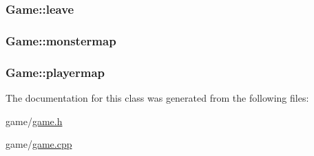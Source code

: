 \hypertarget{class_game_ace7ec571f69a4a210e5a4d1f80232753}{
\subsubsection[{leave}]{ Game\-::leave}}\label{class_game_ace7ec571f69a4a210e5a4d1f80232753}
\hypertarget{class_game_a258c0d85bedcded80253fa4727893e5f}{
\subsubsection[{monstermap}]{ Game\-::monstermap}}\label{class_game_a258c0d85bedcded80253fa4727893e5f}
\hypertarget{class_game_a80a6b1acda9236fe3b7fe0350798c177}{
\subsubsection[{playermap}]{ Game\-::playermap}}\label{class_game_a80a6b1acda9236fe3b7fe0350798c177}


The documentation for this class was generated from the following files\-:\begin{DoxyCompactItemize}
\item 
game/\hyperlink{game_8h}{game.\-h}\item 
game/\hyperlink{game_8cpp}{game.\-cpp}\end{DoxyCompactItemize}
